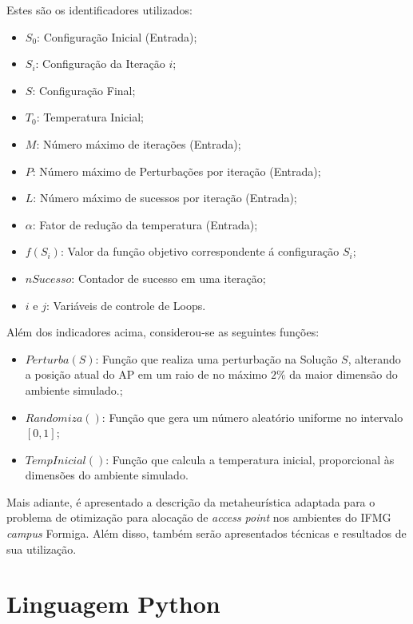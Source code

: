 \documentclass[
	12pt,				%
	twoside,			%
	a4paper,			%
	english,			%
	french,				%
	spanish,			%
	brazil				%
	]{abntex2}
\begin{document}
Estes são os identificadores utilizados:

\begin{itemize}
\item
  \(S_{0}\): Configuração Inicial (Entrada);
\item
  \(S_{i}\): Configuração da Iteração \(i\);
\item
  \(S\): Configuração Final;
\item
  \(T_{0}\): Temperatura Inicial;
\item
  \(M\): Número máximo de iterações (Entrada);
\item
  \(P\): Número máximo de Perturbações por iteração (Entrada);
\item
  \(L\): Número máximo de sucessos por iteração (Entrada);
\item
  \(\alpha\): Fator de redução da temperatura (Entrada);
\item
  \(f(S_{i})\): Valor da função objetivo correspondente á configuração
  \(S_{i}\);
\item
  \(nSucesso\): Contador de sucesso em uma iteração;
\item
  \(i\) e \(j\): Variáveis de controle de Loops.
\end{itemize}

Além dos indicadores acima, considerou-se as seguintes funções:

\begin{itemize}
\item
  \(Perturba(S)\): Função que realiza uma perturbação na Solução \(S\),
  alterando a posição atual do AP em um raio de no máximo \(2\%\) da
  maior dimensão do ambiente simulado.;
\item
  \(Randomiza()\): Função que gera um número aleatório uniforme no
  intervalo \([0, 1]\);
\item
  \(TempInicial()\): Função que calcula a temperatura inicial,
  proporcional às dimensões do ambiente simulado.
\end{itemize}

Mais adiante, é apresentado a descrição da metaheurística adaptada para
o problema de otimização para alocação de \emph{access point} nos
ambientes do IFMG \emph{campus} Formiga. Além disso, também serão
apresentados técnicas e resultados de sua utilização.

\section{Linguagem Python}\label{linguagem-python}
\end{document}
